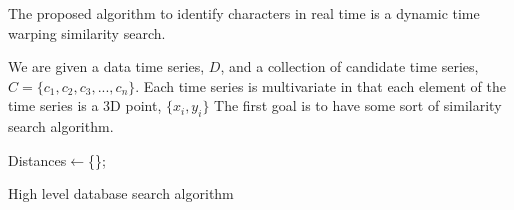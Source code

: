 The proposed algorithm to identify characters in real time is a dynamic time warping similarity search. 


We are given a data time series, \(D\), and a collection of candidate time series, \( C = \{c_1, c_2, c_3, ..., c_n\}\).
Each time series is multivariate in that each element of the time series is a 3D point, \(\{x_i, y_i\}\)
The first goal is to have some sort of similarity search algorithm.
\begin{algorithm}[h]



 \Input{\Collection, \D}
 Distances$\leftarrow$\{\};\\
 \caption{High level database search algorithm}
\end{algorithm}


